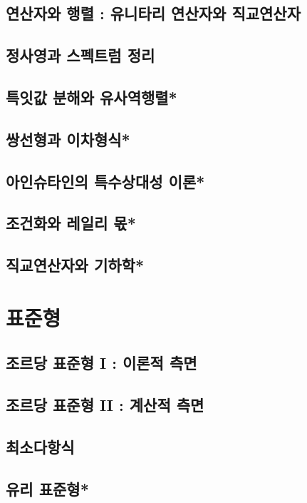 \documentclass{oblivoir}
\begin{document}
\subsection{연산자와 행렬 : 유니타리 연산자와 직교연산자}
\subsection{정사영과 스펙트럼 정리}
\subsection{특잇값 분해와 유사역행렬*}
\subsection{쌍선형과 이차형식*}
\subsection{아인슈타인의 특수상대성 이론*}
\subsection{ 조건화와 레일리 몫*}
\subsection{ 직교연산자와 기하학*}

\newpage
\section{표준형}
\subsection{조르당 표준형 I : 이론적 측면}
\subsection{조르당 표준형 II : 계산적 측면}
\subsection{최소다항식}
\subsection{유리 표준형*}
\end{document}
